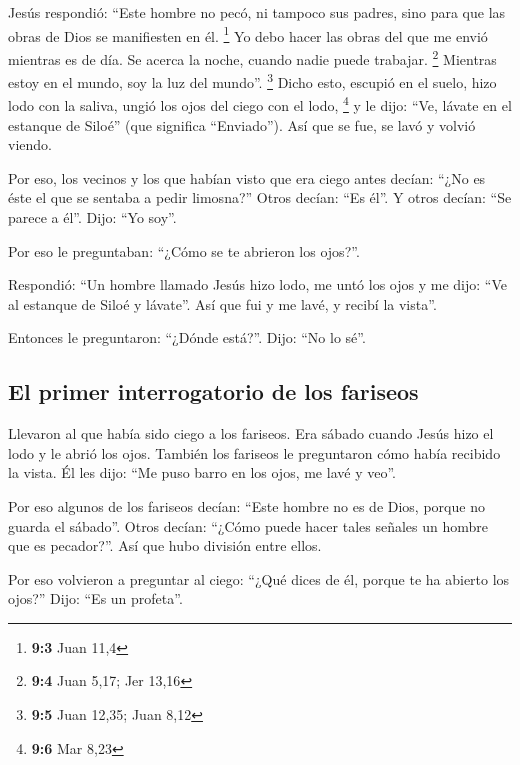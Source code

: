 \begin{paracol}{2}
 Jesús respondió: ``Este hombre no pecó, ni tampoco sus
padres, sino para que las obras de Dios se manifiesten en él.
\footnote{\textbf{9:3} Juan 11,4}  Yo debo hacer las obras
del que me envió mientras es de día. Se acerca la noche, cuando nadie
puede trabajar. \footnote{\textbf{9:4} Juan 5,17; Jer 13,16}
 Mientras estoy en el mundo, soy la luz del mundo''.
\footnote{\textbf{9:5} Juan 12,35; Juan 8,12}  Dicho esto,
escupió en el suelo, hizo lodo con la saliva, ungió los ojos del ciego
con el lodo, \footnote{\textbf{9:6} Mar 8,23}  y le dijo:
``Ve, lávate en el estanque de Siloé'' (que significa ``Enviado''). Así
que se fue, se lavó y volvió viendo.

 Por eso, los vecinos y los que habían visto que era ciego
antes decían: ``¿No es éste el que se sentaba a pedir limosna?''
 Otros decían: ``Es él''. Y otros decían: ``Se parece a
él''. Dijo: ``Yo soy''.

 Por eso le preguntaban: ``¿Cómo se te abrieron los
ojos?''.

 Respondió: ``Un hombre llamado Jesús hizo lodo, me untó
los ojos y me dijo: ``Ve al estanque de Siloé y lávate''. Así que fui y
me lavé, y recibí la vista''.

 Entonces le preguntaron: ``¿Dónde está?''. Dijo: ``No lo
sé''.

\hypertarget{el-primer-interrogatorio-de-los-fariseos}{%
\subsection{El primer interrogatorio de los
fariseos}\label{el-primer-interrogatorio-de-los-fariseos}}

 Llevaron al que había sido ciego a los fariseos.
 Era sábado cuando Jesús hizo el lodo y le abrió los
ojos.  También los fariseos le preguntaron cómo había
recibido la vista. Él les dijo: ``Me puso barro en los ojos, me lavé y
veo''.

 Por eso algunos de los fariseos decían: ``Este hombre no
es de Dios, porque no guarda el sábado''. Otros decían: ``¿Cómo puede
hacer tales señales un hombre que es pecador?''. Así que hubo división
entre ellos.

 Por eso volvieron a preguntar al ciego: ``¿Qué dices de
él, porque te ha abierto los ojos?'' Dijo: ``Es un profeta''.


\end{paracol}
